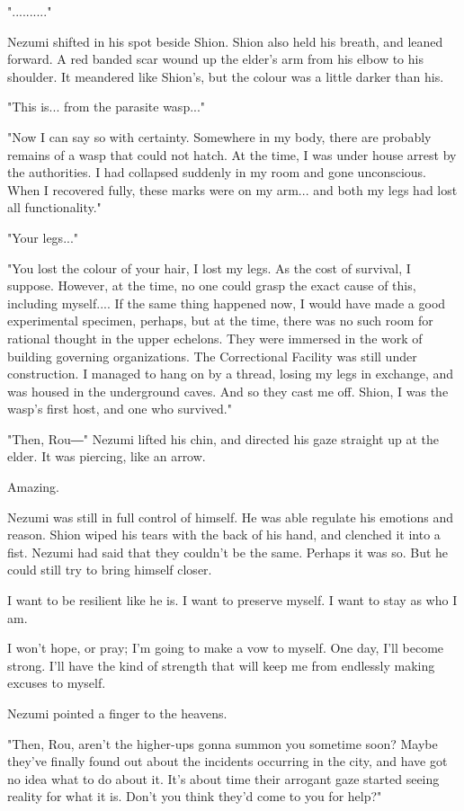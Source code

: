 ".........."

Nezumi shifted in his spot beside Shion. Shion also held his breath, and
leaned forward. A red banded scar wound up the elder's arm from his
elbow to his shoulder. It meandered like Shion's, but the colour was a
little darker than his.

"This is... from the parasite wasp..."

"Now I can say so with certainty. Somewhere in my body, there are
probably remains of a wasp that could not hatch. At the time, I was
under house arrest by the authorities. I had collapsed suddenly in my
room and gone unconscious. When I recovered fully, these marks were on
my arm... and both my legs had lost all functionality."

"Your legs..."

"You lost the colour of your hair, I lost my legs. As the cost of
survival, I suppose. However, at the time, no one could grasp the exact
cause of this, including myself.... If the same thing happened now, I
would have made a good experimental specimen, perhaps, but at the time,
there was no such room for rational thought in the upper echelons. They
were immersed in the work of building governing organizations. The
Correctional Facility was still under construction. I managed to hang on
by a thread, losing my legs in exchange, and was housed in the
underground caves. And so they cast me off. Shion, I was the wasp's
first host, and one who survived."

"Then, Rou―" Nezumi lifted his chin, and directed his gaze straight up
at the elder. It was piercing, like an arrow.

Amazing.

Nezumi was still in full control of himself. He was able regulate his
emotions and reason. Shion wiped his tears with the back of his hand,
and clenched it into a fist. Nezumi had said that they couldn't be the
same. Perhaps it was so. But he could still try to bring himself closer.

I want to be resilient like he is. I want to preserve myself. I want to
stay as who I am.

I won't hope, or pray; I'm going to make a vow to myself. One day, I'll
become strong. I'll have the kind of strength that will keep me from
endlessly making excuses to myself.

Nezumi pointed a finger to the heavens.

"Then, Rou, aren't the higher-ups gonna summon you sometime soon? Maybe
they've finally found out about the incidents occurring in the city, and
have got no idea what to do about it. It's about time their arrogant
gaze started seeing reality for what it is. Don't you think they'd come
to you for help?"

